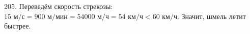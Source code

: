 205. Переведём скорость стрекозы: $15\text{ м/с}=900\text{ м/мин}=54000\text{ м/ч}=54\text{ км/ч}<60\text{ км/ч}.$ Значит, шмель летит быстрее.\\
